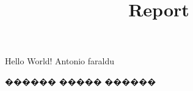 \documentclass{article}
\title{Report}
\begin{document}
Hello World! 
Antonio faraldu

 ������ ����� ������
\end{document}
